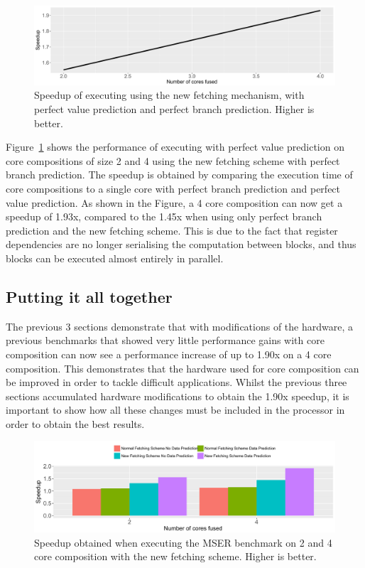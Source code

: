 \begin{figure}[t]
    \centering
    \includegraphics[width=1\textwidth]{chapter3/graphics/mser_fetch_motiv.pdf}
    \caption{Speedup of executing  using the new fetching mechanism, with perfect value prediction and perfect branch prediction. Higher is better.}
    \label{fig:motivation_reg}
	\vspace{1em}
\end{figure}

Figure~\ref{fig:motivation_reg} shows the performance of executing  with perfect value prediction on core compositions of size 2 and 4 using the new fetching scheme with perfect branch prediction.
The speedup is obtained by comparing the execution time of core compositions to a single core with perfect branch prediction and perfect value prediction.
As shown in the Figure, a 4 core composition can now get a speedup of 1.93x, compared to the 1.45x when using only perfect branch prediction and the new fetching scheme.
This is due to the fact that register dependencies are no longer serialising the computation between blocks, and thus blocks can be executed almost entirely in parallel.

\subsection{Putting it all together}

The previous 3 sections demonstrate that with modifications of the hardware, a previous benchmarks that showed very little performance gains with core composition can now see a performance increase of up to 1.90x on a 4 core composition.
This demonstrates that the hardware used for core composition can be improved in order to tackle difficult applications.
Whilst the previous three sections accumulated hardware modifications to obtain the 1.90x speedup, it is important to show how all these changes must be included in the processor in order to obtain the best results.

\begin{figure}[t]
    \centering
    \includegraphics[width=1\textwidth]{chapter3/graphics/mser_final_motiv.pdf}
    \caption{Speedup obtained when executing the MSER benchmark on 2 and 4 core composition with the new fetching scheme. Higher is better.}
    \label{fig:motivation_final}
	\vspace{1em}
\end{figure}

